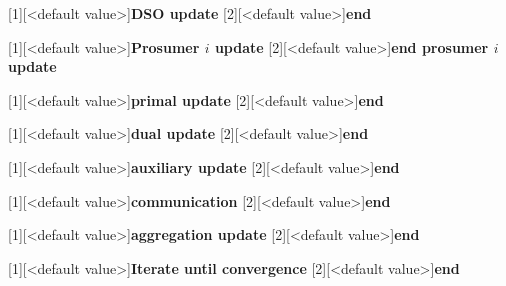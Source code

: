 \documentclass[10pt]{article}
\newtheorem{definitiox	n}{Definition}{\it}{}
\newcommand{\0}{\mathbf{0}}
\newcommand{\1}{\mathbf{1}}
\begin{document}
\newpage

[1][<default value>]{\textbf{DSO update}}
[2][<default value>]{\textbf{end}}

[1][<default value>]{\textbf{Prosumer $i$ update}}
[2][<default value>]{\textbf{end prosumer $i$ update}}

[1][<default value>]{\textbf{primal update}}
[2][<default value>]{\textbf{end}}

[1][<default value>]{\textbf{dual update}}
[2][<default value>]{\textbf{end}}

[1][<default value>]{\textbf{auxiliary update}}
[2][<default value>]{\textbf{end}}

[1][<default value>]{\textbf{communication}}
[2][<default value>]{\textbf{end}}

[1][<default value>]{\textbf{aggregation update}}
[2][<default value>]{\textbf{end}}

[1][<default value>]{\textbf{Iterate until convergence}}
[2][<default value>]{\textbf{end}}
\end{document}
